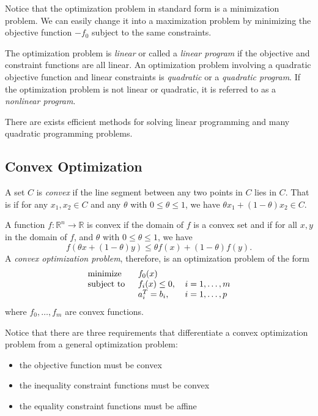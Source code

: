 Notice that the optimization problem in standard form is a minimization problem.  We can easily change it into a maximization problem by minimizing the objective function $-f_0$ subject to the same constraints.

The optimization problem is \textit{linear} or called a \textit{linear program} if the objective and constraint functions are all linear. An optimization problem involving a quadratic objective function and linear constraints is \textit{quadratic} or a \textit{quadratic program}. If the optimization problem is not linear or quadratic, it is referred to as a \textit{nonlinear program}.

There are exists efficient methods for solving linear programming and many quadratic programming problems.

\subsection{Convex Optimization}

A set $C$ is \textit{convex} if the line segment between any two points in $C$ lies in $C$. That is if for any $x_1,x_2\in C$ and any $\theta$ with $0\leq\theta\leq 1$, we have $\theta x_1+(1-\theta)x_2\in C$.

A function $f : \mathbb{R}^n\rightarrow\mathbb{R}$ is convex if the domain of $f$ is a convex set and if for all $x,y$ in the domain of $f$, and $\theta$ with $0\leq\theta\leq 1$, we have
\begin{equation}
		f\left(\theta x+\left(1-\theta\right)y\right)\leq\theta f(x)+(1-\theta)f(y).
		\label{eqn:Convexity}
	\end{equation}
A \textit{convex optimization problem}, therefore, is an optimization problem of the form
\begin{equation}
		\begin{tabular}{lll}
			\text{minimize }   & $f_0(x)$          & \\
			\text{subject to } & $f_i(x)\leq 0$, & $i=1,\ldots, m$\\
			& $a_i^T = b_i$,      & $i=1,\ldots, p$
		\end{tabular}\label{ConvexOptimization}
	\end{equation}
	where $f_0,\ldots,f_m$ are convex functions.

Notice that there are three requirements that differentiate a convex optimization problem from a general optimization problem:
\begin{itemize}
		\item the objective function must be convex
		\item the inequality constraint functions must be convex
		\item the equality constraint functions must be affine
	\end{itemize}

